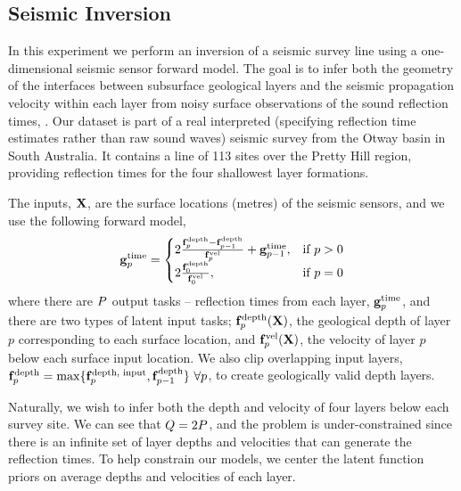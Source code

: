 \subsection{Seismic Inversion}

In this experiment we perform an inversion of a seismic survey line using a
one-dimensional seismic sensor forward model. The goal is to infer both the
geometry of the interfaces between subsurface geological layers and the
seismic propagation velocity within each layer from noisy surface observations
of the sound reflection times, \Outs. 
Our dataset is part of a real interpreted (specifying reflection time
estimates rather than raw sound waves) seismic survey from the Otway basin in
South Australia.  It contains a line of 113 sites over the Pretty Hill region,
providing reflection times for the four shallowest layer formations.

The inputs, $\mathbf{X}$, are the surface locations (metres) of the seismic sensors,
and we use the following forward model,
\begin{equation}
    \mathbf{g}_p^\text{time} =
    \begin{cases}
        2\frac{\mathbf{f}_p^\text{depth} - \mathbf{f}_{p-1}^\text{depth}}
        {\mathbf{f}_p^\text{vel}} + \mathbf{g}_{p-1}^\text{time},
        & \text{if } p > 0 \\
        2\frac{\mathbf{f}_0^\text{depth}}{\mathbf{f}_0^\text{vel}},
        & \text{if } p = 0
    \end{cases}
\end{equation}
where there are $P$ output tasks -- reflection times from each layer,
$\mathbf{g}_p^\text{time}$, and there are two types of latent input tasks;
$\mathbf{f}_p^\text{depth}\!\left({\mathbf{X}}\right)$, the geological depth of layer $p$
corresponding to each surface location, and
$\mathbf{f}_p^\text{vel}\!\left({\mathbf{X}}\right)$, the velocity of layer $p$ below each
surface input location. We also clip overlapping input layers,
$\mathbf{f}_p^\text{depth} = \max\{\mathbf{f}_p^\text{depth, input},
\mathbf{f}_{p-1}^\text{depth}\}~\forall p$, to create geologically valid depth
layers.

Naturally, we wish to infer both the depth and velocity of four layers below
each survey site. We can see that $Q = 2P$, and the problem is
under-constrained since there is an infinite set of layer depths and
velocities that can generate the reflection times. To help constrain our
models, we center the latent function priors on average depths and velocities
of each layer.

